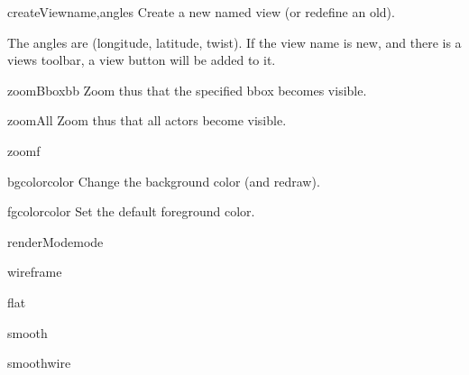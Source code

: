 \begin{funcdesc}{createView}{name,angles}
Create a new named view (or redefine an old).

    The angles are (longitude, latitude, twist).
    If the view name is new, and there is a views toolbar,
    a view button will be added to it.
    

\end{funcdesc}


\begin{funcdesc}{zoomBbox}{bb}
Zoom thus that the specified bbox becomes visible.

\end{funcdesc}


\begin{funcdesc}{zoomAll}{}
Zoom thus that all actors become visible.

\end{funcdesc}


\begin{funcdesc}{zoom}{f}


\end{funcdesc}


\begin{funcdesc}{bgcolor}{color}
Change the background color (and redraw).

\end{funcdesc}


\begin{funcdesc}{fgcolor}{color}
Set the default foreground color.

\end{funcdesc}


\begin{funcdesc}{renderMode}{mode}


\end{funcdesc}


\begin{funcdesc}{wireframe}{}


\end{funcdesc}


\begin{funcdesc}{flat}{}


\end{funcdesc}


\begin{funcdesc}{smooth}{}


\end{funcdesc}


\begin{funcdesc}{smoothwire}{}


\end{funcdesc}


